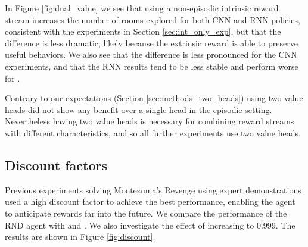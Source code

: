 \documentclass{article} \usepackage[dvipsnames]{xcolor}
\begin{document}
In Figure \ref{fig:dual_value} we see that using a non-episodic intrinsic reward stream increases the number of rooms explored for both CNN and RNN policies, consistent with the experiments in Section \ref{sec:int_only_exp}, but that the difference is less dramatic, likely because the extrinsic reward is able to preserve useful behaviors. We also see that the difference is less pronounced for the CNN experiments, and that the RNN results tend to be less stable and perform worse for .

Contrary to our expectations (Section \ref{sec:methods_two_heads}) using two value heads did not show any benefit over a single head in the episodic setting. Nevertheless having two value heads is necessary for combining reward streams with different characteristics, and so all further experiments use two value heads.
\subsection{Discount factors}
Previous experiments \citep{salimans2018mz, pohlen2018observe,garmulewicz2018expert} solving Montezuma's Revenge using expert demonstrations used a high discount factor to achieve the best performance, enabling the agent to anticipate rewards far into the future. We compare the performance of the RND agent with  and . We also investigate the effect of increasing  to 0.999. The results are shown in Figure \ref{fig:discount}.
\end{document}
